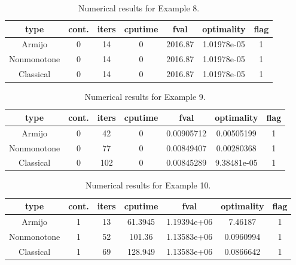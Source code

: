 \documentclass[a4paper]{article}
\begin{document}
  \begin{table}[p]
    \centering
    \begin{tabular}{cc|ccccc}
      \hline
      type & cont. & iters & cputime & 
      fval & optimality & flag \\ \hline
      Armijo & 0 & 14 & 0 & 2016.87 & 1.01978e-05 & 1 \\
      Nonmonotone & 0 & 14 & 0 & 2016.87 & 1.01978e-05 & 1 \\
      Classical & 0 & 14 & 0 & 2016.87 & 1.01978e-05 & 1 \\
      \hline
    \end{tabular}
    \caption{Numerical results for Example 8.}
    \label{tab8}
  \end{table}
  
  
  
  \begin{table}[p]
    \centering
    \begin{tabular}{cc|ccccc}
      \hline
      type & cont. & iters & cputime & 
      fval & optimality & flag \\ \hline
      Armijo & 0 & 42 & 0 & 0.00905712 & 0.00505199 & 1 \\
      Nonmonotone & 0 & 77 & 0 & 0.00849407 & 0.00280368 & 1 \\
      Classical & 0 & 102 & 0 & 0.00845289 & 9.38481e-05 & 1 \\
      \hline
    \end{tabular}
    \caption{Numerical results for Example 9.}
    \label{tab9}
  \end{table}
  
  
  
  \begin{table}[p]
    \centering
    \begin{tabular}{cc|ccccc}
      \hline
      type & cont. & iters & cputime & 
      fval & optimality & flag \\ \hline
      Armijo & 1 & 13 & 61.3945 & 1.19394e+06 & 7.46187 & 1 \\
      Nonmonotone & 1 & 52 & 101.36 & 1.13583e+06 & 0.0960994 & 1 \\
      Classical & 1 & 69 & 128.949 & 1.13583e+06 & 0.0866642 & 1 \\
      \hline
    \end{tabular}
    \caption{Numerical results for Example 10.}
    \label{tab10}
  \end{table}
\end{document}

